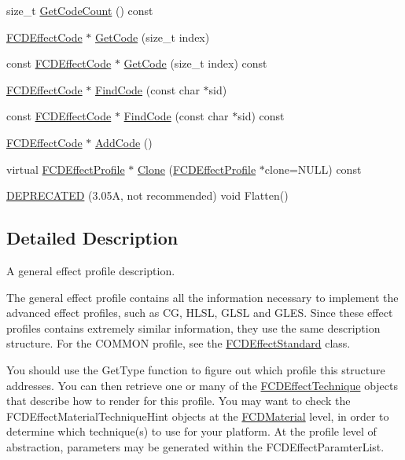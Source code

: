 \begin{DoxyCompactItemize}
\item 
size\_\-t \hyperlink{classFCDEffectProfileFX_a4014013862a3bbda5a93162279dc2698}{GetCodeCount} () const 
\item 
\hyperlink{classFCDEffectCode}{FCDEffectCode} $\ast$ \hyperlink{classFCDEffectProfileFX_adf8d6b95a3a98efd8c3df44cdf301347}{GetCode} (size\_\-t index)
\item 
const \hyperlink{classFCDEffectCode}{FCDEffectCode} $\ast$ \hyperlink{classFCDEffectProfileFX_aab857859ae788ec5d8da9641ce4ca6cb}{GetCode} (size\_\-t index) const 
\item 
\hyperlink{classFCDEffectCode}{FCDEffectCode} $\ast$ \hyperlink{classFCDEffectProfileFX_af704be744d23f8edf5f253649d6f08c2}{FindCode} (const char $\ast$sid)
\item 
const \hyperlink{classFCDEffectCode}{FCDEffectCode} $\ast$ \hyperlink{classFCDEffectProfileFX_a5a33aac3ed1633e3b02b071debe27492}{FindCode} (const char $\ast$sid) const 
\item 
\hyperlink{classFCDEffectCode}{FCDEffectCode} $\ast$ \hyperlink{classFCDEffectProfileFX_a953350d444182d9c325166d120b6510c}{AddCode} ()
\item 
virtual \hyperlink{classFCDEffectProfile}{FCDEffectProfile} $\ast$ \hyperlink{classFCDEffectProfileFX_affaefb11964c4000f30e2f7be7cd2aa5}{Clone} (\hyperlink{classFCDEffectProfile}{FCDEffectProfile} $\ast$clone=NULL) const 
\item 
\hyperlink{classFCDEffectProfileFX_a3a00d4ed2dec686e7e0a60eb99168ff5}{DEPRECATED} (3.05A, not recommended) void Flatten()
\end{DoxyCompactItemize}


\subsection{Detailed Description}
A general effect profile description.

The general effect profile contains all the information necessary to implement the advanced effect profiles, such as CG, HLSL, GLSL and GLES. Since these effect profiles contains extremely similar information, they use the same description structure. For the COMMON profile, see the \hyperlink{classFCDEffectStandard}{FCDEffectStandard} class.

You should use the GetType function to figure out which profile this structure addresses. You can then retrieve one or many of the \hyperlink{classFCDEffectTechnique}{FCDEffectTechnique} objects that describe how to render for this profile. You may want to check the FCDEffectMaterialTechniqueHint objects at the \hyperlink{classFCDMaterial}{FCDMaterial} level, in order to determine which technique(s) to use for your platform. At the profile level of abstraction, parameters may be generated within the FCDEffectParamterList. 

